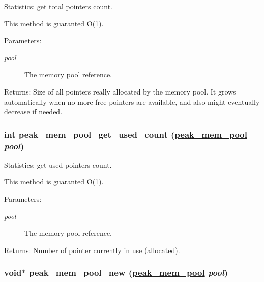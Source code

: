 Statistics: get total pointers count. 

This method is guaranted O(1).

\begin{Desc}
\item[Parameters:]
\begin{description}
\item[{\em pool}]The memory pool reference.\end{description}
\end{Desc}
\begin{Desc}
\item[Returns:]Size of all pointers really allocated by the memory pool. It grows automatically when no more free pointers are available, and also might eventually decrease if needed. \end{Desc}
\hypertarget{group__mem__pool_ga4}{
\subsubsection[peak\_\-mem\_\-pool\_\-get\_\-used\_\-count]{\setlength{\rightskip}{0pt plus 5cm}int peak\_\-mem\_\-pool\_\-get\_\-used\_\-count (\hyperlink{group__mem__pool_ga0}{peak\_\-mem\_\-pool} {\em pool})}}
\label{group__mem__pool_ga4}


Statistics: get used pointers count. 

This method is guaranted O(1).

\begin{Desc}
\item[Parameters:]
\begin{description}
\item[{\em pool}]The memory pool reference.\end{description}
\end{Desc}
\begin{Desc}
\item[Returns:]Number of pointer currently in use (allocated). \end{Desc}
\hypertarget{group__mem__pool_ga2}{
\subsubsection[peak\_\-mem\_\-pool\_\-new]{\setlength{\rightskip}{0pt plus 5cm}void$\ast$ peak\_\-mem\_\-pool\_\-new (\hyperlink{group__mem__pool_ga0}{peak\_\-mem\_\-pool} {\em pool})}}
\label{group__mem__pool_ga2}



